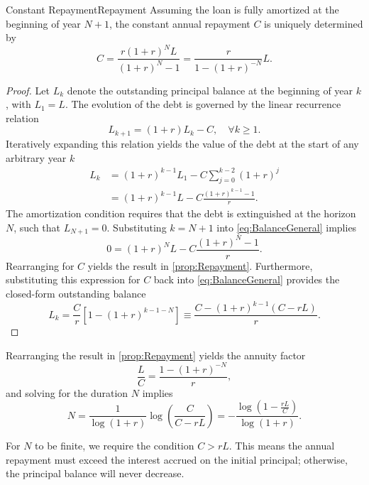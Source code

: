 \begin{prop}{Constant Repayment}{Repayment}
	Assuming the loan is fully amortized at the beginning of year \(N+1\), the constant annual repayment \(C\) is uniquely determined by
	\begin{equation}
		C = \frac{r(1+r)^N L}{(1+r)^N - 1} = \frac{r}{1 - (1+r)^{-N}} L.
	\end{equation}
\end{prop}
\begin{proof}
	Let \(L_k\) denote the outstanding principal balance at the beginning of year \(k\), with \(L_1 = L\). The evolution of the debt is governed by the linear recurrence relation
	\begin{equation}
		L_{k+1} = (1+r)L_k - C, \quad \forall k \ge 1.
	\end{equation}
	Iteratively expanding this relation yields the value of the debt at the start of any arbitrary year \(k\)
	\begin{align}
		L_k & = (1+r)^{k-1}L_1 - C \sum_{j=0}^{k-2} (1+r)^j \nonumber                 \\
		    & = (1+r)^{k-1}L - C \frac{(1+r)^{k-1} - 1}{r}. \label{eq:BalanceGeneral}
	\end{align}
	The amortization condition requires that the debt is extinguished at the horizon \(N\), such that \(L_{N+1} = 0\). Substituting \(k=N+1\) into \cref{eq:BalanceGeneral} implies
	\[
		0 = (1+r)^N L - C \frac{(1+r)^N - 1}{r}.
	\]
	Rearranging for \(C\) yields the result in \ref{prop:Repayment}. Furthermore, substituting this expression for \(C\) back into \cref{eq:BalanceGeneral} provides the closed-form outstanding balance
	\begin{equation}
		L_k = \frac{C}{r} \left[ 1 - (1+r)^{k-1-N} \right] \equiv \frac{C - (1+r)^{k-1}(C - rL)}{r}.
	\end{equation}
\end{proof}
\noindent Rearranging the result in \ref{prop:Repayment} yields the annuity factor
\begin{equation}
	\frac{L}{C} = \frac{1 - (1+r)^{-N}}{r},
\end{equation}
and solving for the duration \(N\) implies
\begin{equation}
	N = \frac{1}{\log(1+r)} \log \left( \frac{C}{C - rL} \right) = - \frac{\log(1 - \frac{rL}{C})}{\log(1+r)}.
\end{equation}
\begin{xtip}
	For \(N\) to be finite, we require the condition \(C > rL\). This means the annual repayment must exceed the interest accrued on the initial principal; otherwise, the principal balance will never decrease.
\end{xtip}

